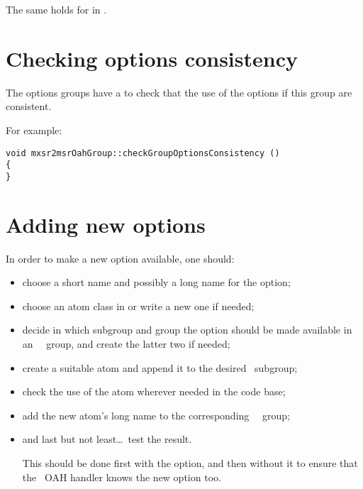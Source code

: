 The same holds for  in .


\section{Checking options consistency}


The options groups have a  to check that the use of the options if this group are consistent.

For example:
\begin{lstlisting}[language=Terminal]
void mxsr2msrOahGroup::checkGroupOptionsConsistency ()
{
}
\end{lstlisting}


\section{Adding new options}

In order to make a new option available, one should:
\begin{itemize}
\item choose a short name and possibly a long name for the option;
\item choose an atom class   in  or write a new one if needed;
\item decide in which subgroup and group the option should be made available in an \insider\ \oahRepr\ group, and create the latter two if needed;
\item create a suitable atom and append it to the desired \oahRepr\ subgroup;
\item check the use of the atom wherever needed in the code base;
\item add the new atom's long name to the corresponding \regular\ \oahRepr\ group;
\item and last but not least\dots\ test the result.

			This should be done first with the  option, and then without it to ensure that the \regular\ OAH handler knows the new option too.
\end{itemize}


